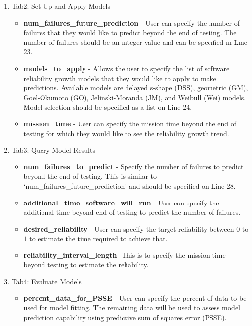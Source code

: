 \documentclass[conference]{IEEEtran}
\begin{document}
\begin{itemize}
{\begin{enumerate}
{\begin{itemize}
    \end{itemize}
    }
    \item {Tab2: Set Up and Apply Models
    \begin{itemize}
      \item {\textbf{num\_failures\_future\_prediction} - User can specify the number of failures that they would like to predict beyond the end of testing. The number of failures should be an integer value and can be specified in Line 23.}
      \item {\textbf{models\_to\_apply} - Allows the user to specify the list of software reliability growth models that they would like to apply to make predictions. Available models are delayed s-shape (DSS), geometric (GM), Goel-Okumoto (GO), Jelinski-Moranda (JM), and Weibull (Wei) models. Model selection should be specified as a list on Line 24. }
      \item {\textbf{mission\_time} - User can specify the mission time beyond the end of testing for which they would like to see the reliability growth trend.}
    \end{itemize}
    }
    \item {Tab3: Query Model Results
    \begin{itemize}
      \item {\textbf{num\_failures\_to\_predict} - Specify the number of failures to predict beyond the end of testing. This is similar to `num\_failures\_future\_prediction' and should be specified on Line 28.}
      \item {\textbf{additional\_time\_software\_will\_run} - User can specify the additional time beyond end of testing to predict the number of failures. }
      \item {\textbf{desired\_reliability} - User can specify the target reliability between $0$ to $1$ to estimate the time required to achieve that.}
      \item {\textbf{reliability\_interval\_length}- This is to specify the mission time beyond testing to estimate the reliability.}
    \end{itemize}
    }
    \item {Tab4: Evaluate Models
    \begin{itemize}
    \item{\textbf{percent\_data\_for\_PSSE} - User can specify the percent of data to be used for model fitting. The remaining data will be used to assess model prediction capability using predictive sum of squares error (PSSE).}
    \end{itemize}
    }
  \end{enumerate}
  }


\end{itemize}
\end{document}
